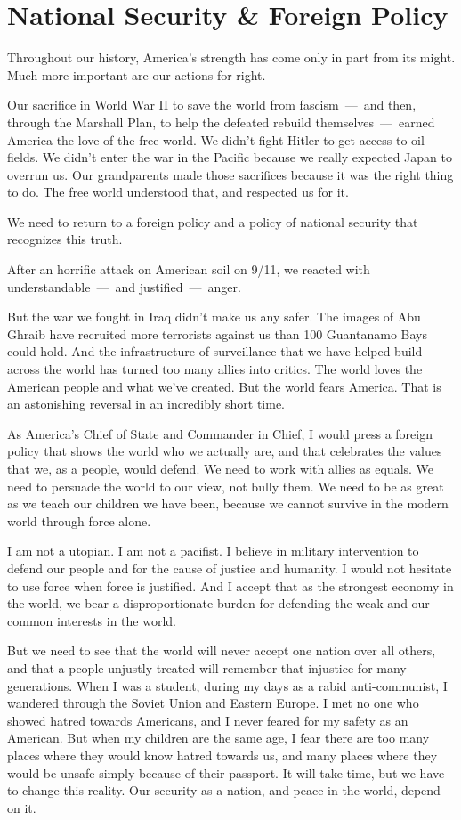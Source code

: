 
\section{National Security \& Foreign Policy}
\label{sec:national-security-}

Throughout our history, America's strength has come only in part from its might. Much more important are our actions for right.

Our sacrifice in World War II to save the world from fascism~---~and then, through the Marshall Plan, to help the defeated rebuild themselves~---~earned America the love of the free world. We didn't fight Hitler to get access to oil fields. We didn't enter the war in the Pacific because we really expected Japan to overrun us. Our grandparents made those sacrifices because it was the right thing to do. The free world understood that, and respected us for it.

We need to return to a foreign policy and a policy of national security that recognizes this truth.

After an horrific attack on American soil on 9/11, we reacted with understandable~---~and justified~---~anger.

But the war we fought in Iraq didn't make us any safer. The images of Abu Ghraib have recruited more terrorists against us than 100 Guantanamo Bays could hold. And the infrastructure of surveillance that we have helped build across the world has turned too many allies into critics. The world loves the American people and what we've created. But the world fears America. That is an astonishing reversal in an incredibly short time.

As America's Chief of State and Commander in Chief, I would press a foreign policy that shows the world who we actually are, and that celebrates the values that we, as a people, would defend. We need to work with allies as equals. We need to persuade the world to our view, not bully them. We need to be as great as we teach our children we have been, because we cannot survive in the modern world through force alone.

I am not a utopian. I am not a pacifist. I believe in military intervention to defend our people and for the cause of justice and humanity. I would not hesitate to use force when force is justified. And I accept that as the strongest economy in the world, we bear a disproportionate burden for defending the weak and our common interests in the world.

But we need to see that the world will never accept one nation over all others, and that a people unjustly treated will remember that injustice for many generations. When I was a student, during my days as a rabid anti-communist, I wandered through the Soviet Union and Eastern Europe. I met no one who showed hatred towards Americans, and I never feared for my safety as an American. But when my children are the same age, I fear there are too many places where they would know hatred towards us, and many places where they would be unsafe simply because of their passport. It will take time, but we have to change this reality. Our security as a nation, and peace in the world, depend on it.

